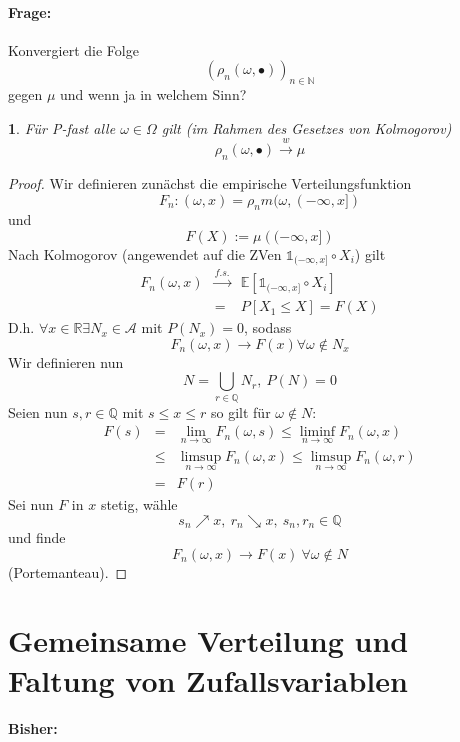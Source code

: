 \documentclass[10pt,a4paper]{report}
\numberwithin{equation}{section}
\numberwithin{figure}{section}
\theoremstyle{plain}
\theoremstyle{definition}
\theoremstyle{remark}
\theoremstyle{plain}
\newtheorem{prop}[thm]{\protect\propositionname}
\providecommand{\propositionname}{Satz}
\newcommand{\1}{ \mathbb{1} } %
\begin{document}
\paragraph*{Frage:}

Konvergiert die Folge 
\[
\left(\rho_{n}\left(\omega,\bullet\right)\right)_{n\in\mathbb{N}}
\]
gegen $\mu$ und wenn ja in welchem Sinn?
\begin{prop}
Für P-fast alle $\omega\in\Omega$ gilt (im Rahmen des Gesetzes von
Kolmogorov)
\[
\rho_{n}\left(\omega,\bullet\right)\overset{w}{\longrightarrow}\mu
\]
\end{prop}
\begin{proof}
Wir definieren zunächst die empirische Verteilungsfunktion
\[
F_{n}:\left(\omega,x\right)=\rho_{n}m(\omega,(-\infty,x])
\]
und 
\[
F\left(X\right):=\mu\left((-\infty,x]\right)
\]
Nach Kolmogorov (angewendet auf die ZVen $\1_{(-\infty,x]}\circ X_{i}$)
gilt 
\begin{eqnarray*}
F_{n}\left(\omega,x\right) & \overset{f.s.}{\longrightarrow} & \mathbb{E}\left[\1_{(-\infty,x]}\circ X_{i}\right]\\
 & = & P\left[X_{1}\leq X\right]=F\left(X\right)
\end{eqnarray*}
D.h. $\forall x\in\mathbb{R}\exists N_{x}\in\mathcal{A}$ mit $P\left(N_{x}\right)=0$,
sodass 
\[
F_{n}\left(\omega,x\right)\to F\left(x\right)\forall\omega\notin N_{x}
\]
Wir definieren nun 
\[
N=\bigcup_{r\in\mathbb{Q}}N_{r},\ P\left(N\right)=0
\]
Seien nun $s,r\in\mathbb{Q}$ mit $s\leq x\leq r$ so gilt für $\omega\notin N$:
\begin{eqnarray*}
F\left(s\right) & = & \lim_{n\to\infty}F_{n}\left(\omega,s\right)\leq\liminf_{n\to\infty}F_{n}\left(\omega,x\right)\\
 & \leq & \limsup_{n\to\infty}F_{n}\left(\omega,x\right)\leq\limsup_{n\to\infty}F_{n}\left(\omega,r\right)\\
 & = & F\left(r\right)
\end{eqnarray*}
Sei nun $F$ in $x$ stetig, wähle 
\[
s_{n}\nearrow x,\ r_{n}\searrow x,\ s_{n},r_{n}\in\mathbb{Q}
\]
und finde 
\[
F_{n}\left(\omega,x\right)\to F\left(x\right)\ \forall\omega\notin N
\]
(Portemanteau).
\end{proof}

\section{Gemeinsame Verteilung und Faltung von Zufallsvariablen}


\paragraph*{Bisher: }
\end{document}
